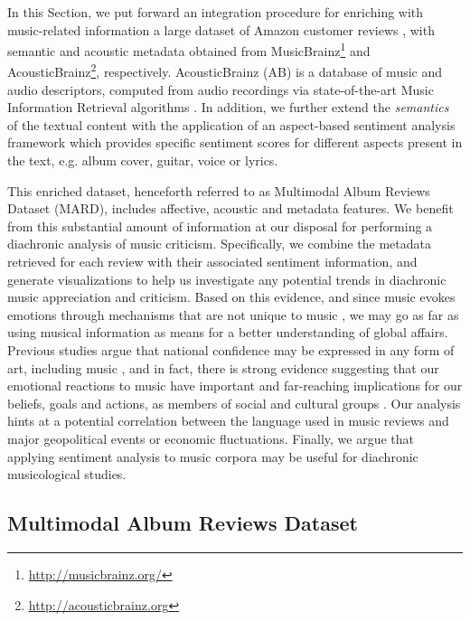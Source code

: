 In this Section, we put forward an integration procedure for enriching with music-related information a large dataset of Amazon customer reviews \cite{McAuley2015a,McAuley2015}, with semantic and acoustic metadata obtained from MusicBrainz\footnote{\url{http://musicbrainz.org/}} and AcousticBrainz\footnote{\url{http://acousticbrainz.org}}, respectively. AcousticBrainz (AB) is a database of music and audio descriptors, computed from audio recordings via state-of-the-art Music Information Retrieval algorithms \cite{Porter2015}.
In addition, we further extend the \textit{semantics} of the textual content with the application of an aspect-based sentiment analysis framework \cite{DongSOS13} which provides specific sentiment scores for different aspects present in the text, e.g. album cover, guitar, voice or lyrics.

This enriched dataset, henceforth referred to as Multimodal Album Reviews Dataset (MARD), includes affective, acoustic and metadata features. %
We benefit from this substantial amount of information at our disposal for performing a diachronic analysis of music criticism. Specifically, we combine the metadata retrieved for each review with their associated sentiment information, and generate visualizations to help us investigate any potential trends in diachronic music appreciation and criticism. Based on this evidence, and since music evokes emotions through mechanisms that are not unique to music \cite{Juslin2008}, we may go as far as using musical information as means for a better understanding of global affairs. Previous studies argue that national confidence may be expressed in any form of art, including music \cite{Moisi2010}, and in fact, there is strong evidence suggesting that our emotional reactions to music have important and far-reaching implications for our beliefs, goals and actions, as members of social and cultural groups \cite{Alcorta2008}. Our analysis hints at a potential correlation between the language used in music reviews and major geopolitical events or economic fluctuations. Finally, we argue that applying sentiment analysis to music corpora may be useful for diachronic musicological studies.


\subsection{Multimodal Album Reviews Dataset}\label{sec:musicology:dataset}

